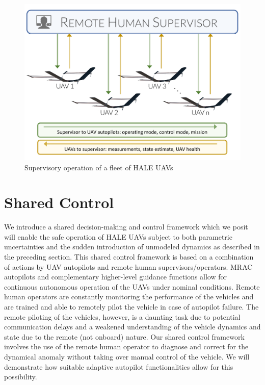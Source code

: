 \documentclass[english]{ifacconf}
\begin{document}
\begin{figure}[htbp]
	\centering
	\includegraphics[width=0.95\columnwidth]{../fig/uav_supervisor.pdf}
	\caption{Supervisory operation of a fleet of HALE UAVs}
	\label{fig:uav_supervisor}
\end{figure}



\section{Shared Control}
We introduce a shared decision-making and control framework which we posit will enable the safe operation of HALE UAVs subject to both parametric uncertainties and the sudden introduction of unmodeled dynamics as described in the preceding section. This shared control framework is based on a combination of actions by UAV autopilots and remote human supervisors/operators. MRAC autopilots and complementary higher-level guidance functions allow for continuous autonomous operation of the UAVs under nominal conditions. Remote human operators are constantly monitoring the performance of the vehicles and are trained and able to remotely pilot the vehicle in case of autopilot failure. The remote piloting of the vehicles, however, is a daunting task due to potential communication delays and a weakened understanding of the vehicle dynamics and state due to the remote (not onboard) nature. Our shared control framework involves the use of the remote human operator to diagnose and correct for the dynamical anomaly without taking over manual control of the vehicle. We will demonstrate how suitable adaptive autopilot functionalities allow for this possibility.
\end{document}
